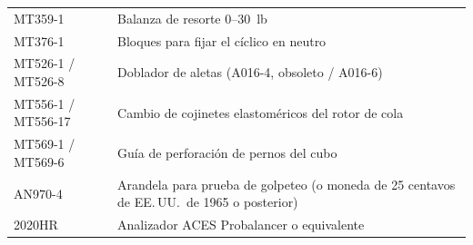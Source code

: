 \begin{center}
\begin{tabularx}{\linewidth}{@{}l>{\raggedright\arraybackslash}X@{}}
MT359-1 & Balanza de resorte 0--30~lb \\
MT376-1 & Bloques para fijar el cíclico en neutro \\
MT526-1 / MT526-8 & Doblador de aletas (A016-4, obsoleto / A016-6) \\
MT556-1 / MT556-17 & Cambio de cojinetes elastoméricos del rotor de cola \\
MT569-1 / MT569-6 & Guía de perforación de pernos del cubo \\
AN970-4 & Arandela para prueba de golpeteo (o moneda de 25 centavos de EE.\,UU.\ de 1965 o posterior) \\
2020HR & Analizador ACES Probalancer o equivalente \\
\bottomrule
\end{tabularx}
\end{center}

